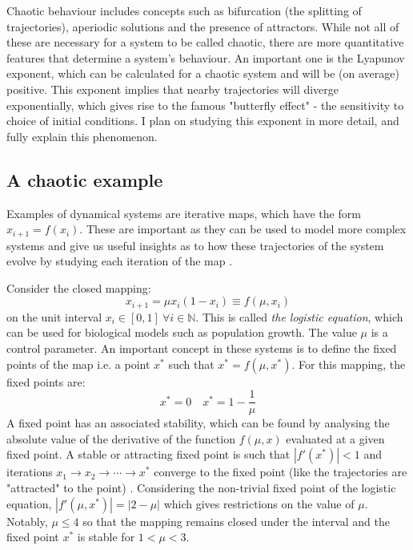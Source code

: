 \documentclass[12pt,a4paper]{amsart}
\begin{document}

Chaotic behaviour includes concepts such as bifurcation (the splitting of trajectories), aperiodic solutions and the presence of attractors. While not all of these are necessary for a system to be called chaotic, there are more quantitative features that determine a system's behaviour. An important one is the Lyapunov exponent, which can be calculated for a chaotic system and will be (on average) positive. This exponent implies that nearby trajectories will diverge exponentially, which gives rise to the famous "butterfly effect" - the sensitivity to choice of initial conditions. I plan on studying this exponent in more detail, and fully explain this phenomenon.

\subsection{A chaotic example}

Examples of dynamical systems are iterative maps, which have the form $x_{i+1} = f(x_{i})$. These are important as they can be used to model more complex systems and give us useful insights as to how these trajectories of the system evolve by studying each iteration of the map \cite{HILBORN}.

Consider the closed mapping: $$x_{i+1} = {\mu} x_{i} (1 - x_{i}) \equiv f(\mu, x_{i}) \label{mapping}$$ on the unit interval $x_{i} \in [0, 1] \  {\forall}i \in \mathbb{N}$. This is called \textit{the logistic equation}, which can be used for biological models such as population growth. The value $\mu$ is a control parameter. An important concept in these systems is to define the fixed points of the map i.e. a point $x^{*}$ such that $x^{*} = f(\mu, x^{*})$. For this mapping, the fixed points are: $$x^{*} = 0 \quad x^{*} = 1 - \frac{1}{\mu}$$ A fixed point has an associated stability, which can be found by analysing the absolute value of the derivative of the function $f(\mu, x)$ evaluated at a given fixed point. A stable or attracting fixed point is such that $|f'(x^{*})| < 1$ and iterations $x_{1} \rightarrow x_{2} \rightarrow \cdots \rightarrow x^{*}$ converge to the fixed point (like the trajectories are "attracted" to the point) \cite{SCHECK}. Considering the non-trivial fixed point of the logistic equation, $|f'(\mu, x^{*})| = |2 - \mu|$ which gives restrictions on the value of $\mu$. Notably, $\mu \leq 4$ so that the mapping remains closed under the interval and the fixed point $x^{*}$ is stable for $1 < \mu < 3$. 
\end{document}
